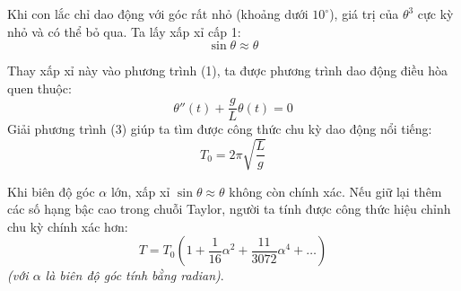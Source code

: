 \documentclass[12pt]{article}
\theoremstyle{definition}
\theoremstyle{remark}
\begin{document}
Khi con lắc chỉ dao động với góc rất nhỏ (khoảng dưới $10^\circ$), giá trị của $\theta^3$ cực kỳ nhỏ và có thể bỏ qua. Ta lấy xấp xỉ cấp 1:
\[
\sin \theta \approx \theta
\]

Thay xấp xỉ này vào phương trình (1), ta được phương trình dao động điều hòa quen thuộc:
\begin{equation}
    \theta''(t) + \frac{g}{L} \theta(t) = 0
\end{equation}
Giải phương trình (3) giúp ta tìm được công thức chu kỳ dao động nổi tiếng:
\begin{equation}
    T_0 = 2\pi \sqrt{\frac{L}{g}}
\end{equation}

Khi biên độ góc $\alpha$ lớn, xấp xỉ $\sin \theta \approx \theta$ không còn chính xác. Nếu giữ lại thêm các số hạng bậc cao trong chuỗi Taylor, người ta tính được công thức hiệu chỉnh chu kỳ chính xác hơn:
\begin{equation}
    T = T_0 \left( 1 + \frac{1}{16}\alpha^2 + \frac{11}{3072}\alpha^4 + \dots \right)
\end{equation}
\textit{(với $\alpha$ là biên độ góc tính bằng radian)}.
\end{document}
